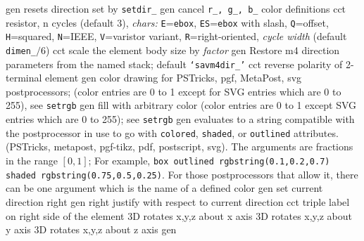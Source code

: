  {gen}
  {resets direction set by {\tt setdir\_}}
  {gen}
  {cancel {\tt r\_, g\_, b\_} color definitions}
  {cct}
  {resistor, n cycles (default 3), {\sl chars:}
    {\tt E}={\tt ebox},
    {\tt ES}={\tt ebox} with slash,
    {\tt Q}=offset,
    {\tt H}=squared,
    {\tt N}=IEEE,
    {\tt V}=varistor variant,
    {\tt R}=right-oriented,
    {\sl cycle width} (default {\tt dimen\_}$/6$) }
  {cct}
  {scale the element body size by {\sl factor}}
  {gen}
  {Restore m4 direction parameters from the named stack;
    default {\tt `savm4dir\_'}}
  {cct}
  {reverse polarity of 2-terminal element}
  {gen}
  {color drawing for PSTricks, pgf, MetaPost, svg postprocessors;
   (color entries are 0 to 1 except for SVG entries which are 0 to 255),
   see {\tt setrgb} }
  {gen}
  {fill with arbitrary color (color entries are 0 to 1 except 
   SVG entries which are 0 to 255); see {\tt setrgb}}
  {gen}
  {evaluates to a string compatible with the postprocessor in use
   to go with {\tt colored}, {\tt shaded}, or {\tt outlined} attributes.
   (PSTricks, metapost, pgf-tikz, pdf, postscript, svg).
   The arguments are fractions
   in the range $[0,1]$; For example,
   {\tt box outlined rgbstring(0.1,0.2,0.7) shaded rgbstring(0.75,0.5,0.25)}.
   For those postprocessors that allow it,
   there can be one argument which is the name of a defined color}
  {gen}
  {set current direction right }
  {gen}
  {right justify with respect to current direction}
  {cct}
  {triple label on right side of the element }
  {3D}
  {rotates x,y,z about x axis}
  {3D}
  {rotates x,y,z about y axis}
  {3D}
  {rotates x,y,z about z axis}
  {gen}
